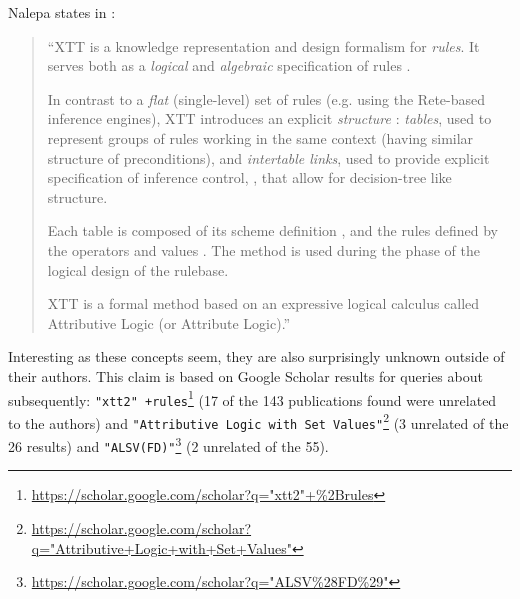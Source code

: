 Nalepa states in \cite{nalepa2008xtt2}:

\begin{quotation}
	``XTT is a knowledge representation and design formalism for \emph{rules}. It serves both as a \emph{logical} and \emph{algebraic} specification of rules \elide.
	
	In contrast to \elide a \emph{flat} (single-level) set of rules (e.g. using the Rete-based inference engines), XTT introduces an explicit \emph{structure} \elide: \emph{tables}, used to represent groups of rules working in the same context (having similar structure of preconditions), and \emph{intertable links}, used to provide explicit specification of inference control, \elide, that allow for decision-tree like structure.
	
	Each table is composed of its scheme \elide definition \elide, and
	the rules defined by the operators and values \elide.
	The method is used during the phase of the logical design of the rulebase. \elide
	
	XTT is a formal method based on an expressive logical calculus called Attributive Logic (or Attribute Logic).''
\end{quotation}

Interesting as these concepts seem, they are also surprisingly unknown outside of their authors. This claim is based on Google Scholar results for queries about subsequently: \texttt{"xtt2"~+rules}\footnote{\url{https://scholar.google.com/scholar?q="xtt2"+\%2Brules}} (17 of the 143 publications found were unrelated to the authors) and \texttt{"Attributive Logic with Set Values"}\footnote{\url{https://scholar.google.com/scholar?q="Attributive+Logic+with+Set+Values"}} (3 unrelated of the 26 results) and \texttt{"ALSV(FD)"}\footnote{\url{https://scholar.google.com/scholar?q="ALSV\%28FD\%29"}} (2 unrelated of the 55).
